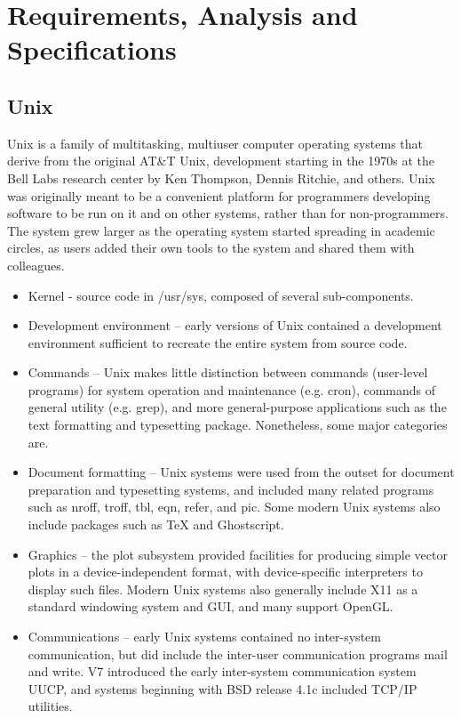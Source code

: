 \chapter{Requirements, Analysis and Specifications}
\section{Unix}
Unix is a family of multitasking, multiuser computer operating systems that derive from the original AT\&T Unix, development starting in the 1970s at the Bell Labs research center by Ken Thompson, Dennis Ritchie, and others.
Unix was originally meant to be a convenient platform for programmers developing software to be run on it and on other systems, rather than for non-programmers. The system grew larger as the operating system started spreading in academic circles, as users added their own tools to the system and shared them with colleagues.
\begin{itemize}
	\item Kernel - source code in /usr/sys, composed of several sub-components.
	\item Development environment – early versions of Unix contained a development environment sufficient to recreate the entire system from source code.
	\item Commands – Unix makes little distinction between commands (user-level programs) for system operation and maintenance (e.g. cron), commands of general utility (e.g. grep), and more general-purpose applications such as the text formatting and typesetting package. Nonetheless, some major categories are.
	\item Document formatting – Unix systems were used from the outset for document preparation and typesetting systems, and included many related programs such as nroff, troff, tbl, eqn, refer, and pic. Some modern Unix systems also include packages such as TeX and Ghostscript.
	\item Graphics – the plot subsystem provided facilities for producing simple vector plots in a device-independent format, with device-specific interpreters to display such files. Modern Unix systems also generally include X11 as a standard windowing system and GUI, and many support OpenGL.
	\item Communications – early Unix systems contained no inter-system communication, but did include the inter-user communication programs mail and write. V7 introduced the early inter-system communication system UUCP, and systems beginning with BSD release 4.1c included TCP/IP utilities.
\end{itemize}
